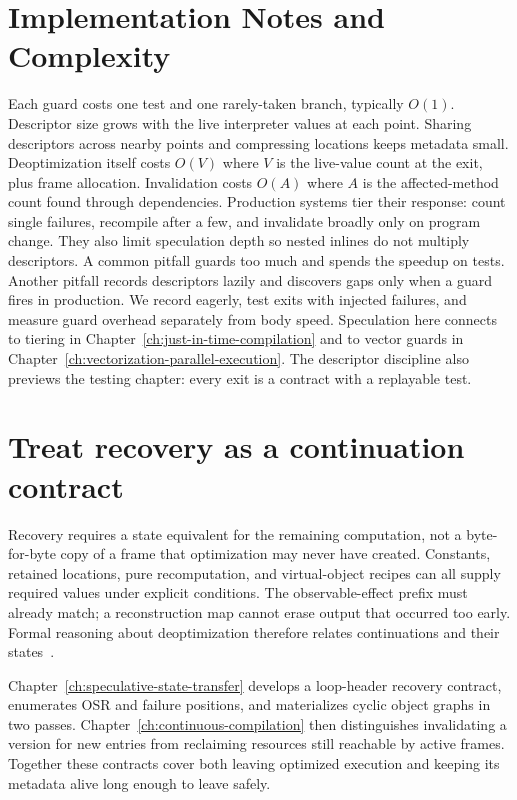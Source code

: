 \section{Implementation Notes and Complexity}\label{sec:ch35-implementation}

Each guard costs one test and one rarely-taken branch, typically $O(1)$.
Descriptor size grows with the live interpreter values at each point.
Sharing descriptors across nearby points and compressing locations keeps metadata small.
Deoptimization itself costs $O(V)$ where $V$ is the live-value count at the exit, plus frame allocation.
Invalidation costs $O(A)$ where $A$ is the affected-method count found through dependencies.
Production systems tier their response: count single failures, recompile after a few, and invalidate broadly only on program change.
They also limit speculation depth so nested inlines do not multiply descriptors.
A common pitfall guards too much and spends the speedup on tests.
Another pitfall records descriptors lazily and discovers gaps only when a guard fires in production.
We record eagerly, test exits with injected failures, and measure guard overhead separately from body speed.
Speculation here connects to tiering in Chapter~\ref{ch:just-in-time-compilation} and to vector guards in Chapter~\ref{ch:vectorization-parallel-execution}.
The descriptor discipline also previews the testing chapter: every exit is a contract with a replayable test.

\section{Treat recovery as a continuation contract}
\label{sec:ch35-transfer-link}

Recovery requires a state equivalent for the remaining computation, not a byte-for-byte copy of a frame that optimization may never have created.
Constants, retained locations, pure recomputation, and virtual-object recipes can all supply required values under explicit conditions.
The observable-effect prefix must already match; a reconstruction map cannot erase output that occurred too early.
Formal reasoning about deoptimization therefore relates continuations and their states~\cite{fluckiger-2018-deoptimization}.

Chapter~\ref{ch:speculative-state-transfer} develops a loop-header recovery contract, enumerates OSR and failure positions, and materializes cyclic object graphs in two passes.
Chapter~\ref{ch:continuous-compilation} then distinguishes invalidating a version for new entries from reclaiming resources still reachable by active frames.
Together these contracts cover both leaving optimized execution and keeping its metadata alive long enough to leave safely.


